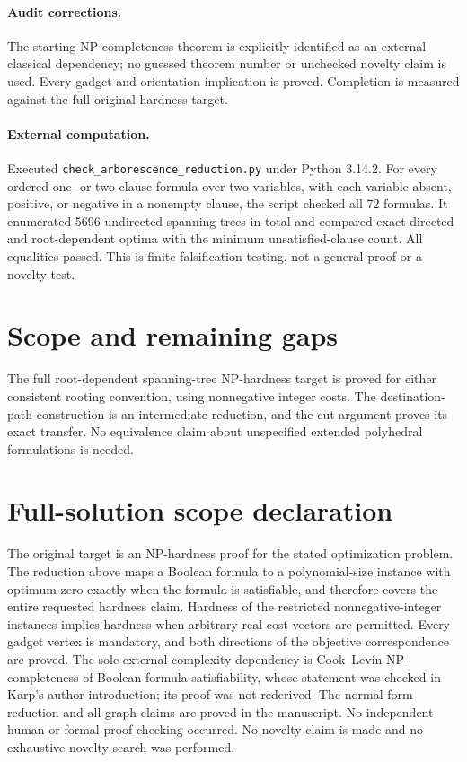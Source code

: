 \documentclass[11pt]{article}
\begin{document}
\paragraph{Audit corrections.} The starting NP-completeness theorem is explicitly identified as an external classical dependency; no guessed theorem number or unchecked novelty claim is used. Every gadget and orientation implication is proved. Completion is measured against the full original hardness target.
\paragraph{External computation.} Executed \texttt{check\_arborescence\_reduction.py} under Python 3.14.2. For every ordered one- or two-clause formula over two variables, with each variable absent, positive, or negative in a nonempty clause, the script checked all 72 formulas. It enumerated 5696 undirected spanning trees in total and compared exact directed and root-dependent optima with the minimum unsatisfied-clause count. All equalities passed. This is finite falsification testing, not a general proof or a novelty test.
\section{Scope and remaining gaps}
The full root-dependent spanning-tree NP-hardness target is proved for either consistent rooting convention, using nonnegative integer costs. The destination-path construction is an intermediate reduction, and the cut argument proves its exact transfer. No equivalence claim about unspecified extended polyhedral formulations is needed.
\section{Full-solution scope declaration}
The original target is an NP-hardness proof for the stated optimization problem.
The reduction above maps a Boolean formula to a polynomial-size instance with
optimum zero exactly when the formula is satisfiable, and therefore covers the
entire requested hardness claim. Hardness of the restricted nonnegative-integer
instances implies hardness when arbitrary real cost vectors are permitted. Every
gadget vertex is mandatory, and both directions of the objective correspondence
are proved. The sole external complexity dependency is Cook--Levin NP-completeness
of Boolean formula satisfiability, whose statement was checked in Karp's author
introduction; its proof was not rederived. The normal-form reduction and all graph
claims are proved in the manuscript. No independent human or formal proof checking
occurred. No novelty claim is made and no exhaustive novelty search was performed.
\end{document}
